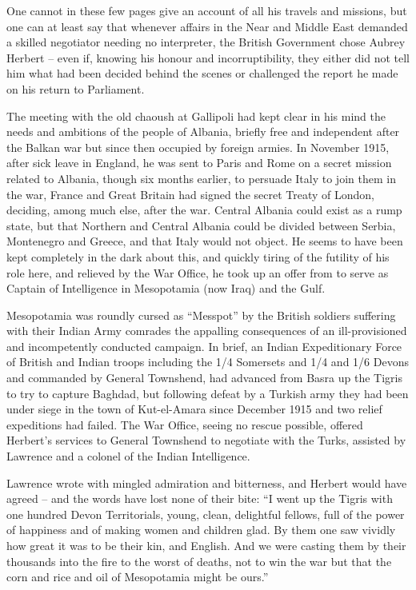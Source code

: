 One cannot in these few pages give an account of all his travels and missions, but one can at least say that whenever affairs in the Near and Middle East demanded a skilled negotiator needing no interpreter, the British Government chose Aubrey Herbert – even if, knowing his honour and incorruptibility, they either did not tell him what had been decided behind the scenes or challenged the report he made on his return to Parliament. 

The meeting with the old chaoush at Gallipoli had kept clear in his mind the needs and ambitions of the people of Albania, briefly free and independent after the Balkan war but since then occupied by foreign armies. In November 1915, after sick leave in England, he was sent to Paris and Rome on a secret mission related to Albania, though six months earlier, to persuade Italy to join them in the war, France and Great Britain had signed the secret Treaty of London, deciding, among much else, after the war. Central Albania could exist as a rump state, but that Northern and Central Albania could be divided between Serbia, Montenegro and Greece, and that Italy would not object. He seems to have been kept completely in the dark about this, and quickly tiring of the futility of his role here, and relieved by the War Office, he took up an offer from to serve as Captain of Intelligence in Mesopotamia (now Iraq) and the Gulf.

Mesopotamia was roundly cursed as “Messpot” by the British soldiers suffering with their Indian Army comrades the appalling consequences of an ill-provisioned and incompetently conducted campaign. In brief, an Indian Expeditionary Force of British and Indian troops including the 1/4 Somersets and 1/4 and 1/6 Devons and commanded by General Townshend, had advanced from Basra up the Tigris to try to capture Baghdad, but following defeat by a Turkish army they had been under siege in the town of Kut-el-Amara since December 1915 and two relief expeditions had failed. The War Office, seeing no rescue possible, offered Herbert’s services to General Townshend to negotiate with the Turks, assisted by Lawrence and a colonel of the Indian Intelligence. 

Lawrence wrote with mingled admiration and bitterness, and Herbert would have agreed – and the words have lost none of their bite: “I went up the Tigris with one hundred Devon Territorials, young, clean, delightful fellows, full of the power of happiness and of making women and children glad. By them one saw vividly how great it was to be their kin, and English. And we were casting them by their thousands into the fire to the worst of deaths, not to win the war but that the corn and rice and oil of Mesopotamia might be ours.”

